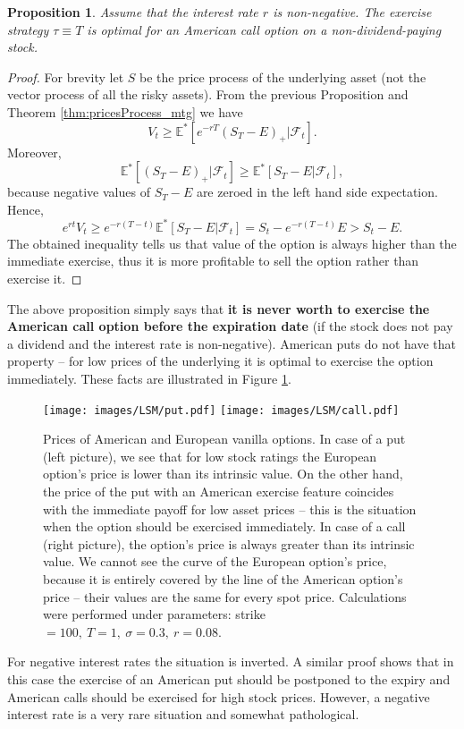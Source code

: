 \documentclass[a4paper,11pt, twoside]{book}
\newtheorem{prop}[thm]{Proposition}
\theoremstyle{definition}
\theoremstyle{remark}
\def\Em{{\mathbb{E}^*}}
\begin{document}
\begin{prop}
\label{prop:amCall}
 Assume that the interest rate $r$ is non-negative. The exercise strategy $\tau \equiv T$ is optimal for an American call option on a non-dividend-paying stock.
\end{prop}
\begin{proof}
 For brevity let $S$ be the price process of the underlying asset (not the vector process of all the risky assets). From the previous Proposition and Theorem \ref{thm:pricesProcess_mtg} we have
 \[V_t \geq \Em[e^{-rT}(S_T - E)_+ | \mathcal{F}_t].\] Moreover,
 \[\Em[(S_T - E)_+ | \mathcal{F}_t] \geq \Em[S_T - E | \mathcal{F}_t],\]
 because negative values of $S_T - E$ are zeroed in the left hand side expectation. Hence,
 \[ e^{rt} V_t \geq e^{-r(T-t)}\Em[S_T - E | \mathcal{F}_t] = S_t - e^{-r(T-t)}E > S_t - E.\]
 The obtained inequality tells us that value of the option is always higher than the immediate exercise, thus it is more profitable to sell the option rather than exercise it.
\end{proof}
The above proposition simply says that \textbf{it is never worth to exercise the American call option before the expiration date} (if the stock does not pay a dividend and the interest rate is non-negative). American puts do not have that property -- for low prices of the underlying it is optimal to exercise the option immediately. These facts are illustrated in Figure \ref{fig:lsm:amPrice}.

\begin{figure}
\centering
 \texttt{[image: images/LSM/put.pdf]}
 \texttt{[image: images/LSM/call.pdf]}
\caption{Prices of American and European vanilla options. In case of a put (left picture), we see that for low stock ratings the European option's price is lower than its intrinsic value. On the other hand, the price of the put with an American exercise feature coincides with the immediate payoff for low asset prices -- this is the situation when the option should be exercised immediately. In case of a call (right picture), the option's price is always greater than its intrinsic value. We cannot see the curve of the European option's price, because it is entirely covered by the line of the American option's price -- their values are the same for every spot price. Calculations were performed under parameters: strike~$=100,\ T=1,\ \sigma=0.3,\ r=0.08$.}
\label{fig:lsm:amPrice}
\end{figure}

For negative interest rates the situation is inverted. A similar proof shows that in this case the exercise of an American put should be postponed to the expiry and American calls should be exercised for high stock prices. However, a negative interest rate is a very rare situation and somewhat pathological.
\end{document}
